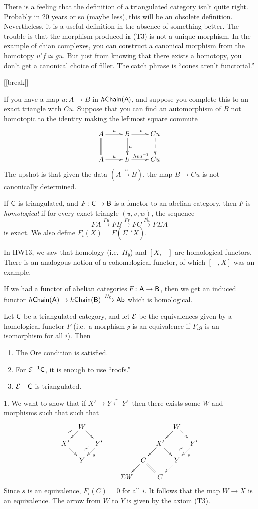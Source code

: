 There is a feeling that the definition of a triangulated category isn't quite right. Probably in 20 years or so (maybe less), this will be an obsolete definition. Nevertheless, it is a useful definition in the absence of something better. The trouble is that the morphism produced in (T3) is not a unique morphism. In the example of chian complexes, you can construct a canonical morphism from the homotopy $u'f\simeq gu$. But just from knowing that there exists a homotopy, you don't get a canonical choice of filler. The catch phrase is ``cones aren't functorial.''

[[break]]

If you have a map $u\colon A\to B$ in $h\text{\sf Chain}(\text{\sf A})$, and suppose you complete this to an exact triangle with $Cu$. Suppose that you can find an automorphism of $B$ not homotopic to the identity making the leftmost square commute
\[\xymatrix{
 A\ar[r]^u \ar@{=}[d] & B \ar[d]^a\ar[r]^v & Cu \ar@{-->}[d]\\
 A\ar[r]^u & B \ar[r]^{hva^{-1}} & Cu
}\]
The upshot is that given the data $(A\xrightarrow u B)$, the map $B\to Cu$ is not canonically determined.
\begin{definition}
 If $\text{\sf C}$ is triangulated, and $F\colon \text{\sf C}\to \text{\sf B}$ is a functor to an abelian category, then $F$ is \emph{homological} if for every exact triangle $(u,v,w)$, the sequence
 \[
  FA\xrightarrow{Fu} FB\xrightarrow{Fv} FC\xrightarrow{Fw} F\Sigma A
 \]
 is exact. We also define $F_i(X)=F(\Sigma^{-i}X)$.
\end{definition}
In HW13, we saw that homology (i.e.~$H_0$) and $[X,-]$ are homological functors. There is an analogous notion of a cohomological functor, of which $[-,X]$ was an example.

If we had a functor of abelian categories $F\colon \text{\sf A}\to \text{\sf B}$, then we get an induced functor $h\text{\sf Chain}(\text{\sf A})\to h\text{\sf Chain}(\text{\sf B})\xrightarrow{H_0} \text{\sf Ab}$ which is homological.

Let $\text{\sf C}$ be a triangulated category, and let $\mathcal{E}$ be the equivalences given by a homological functor $F$ (i.e.~a morphism $g$ is an equivalence if $F_ig$ is an isomorphism for all $i$). Then
\begin{enumerate}
 \item The Ore condition is satisfied.
 \item For $\mathcal{E}^{-1}\text{\sf C}$, it is enough to use ``roofs.''
 \item $\mathcal{E}^{-1}\text{\sf C}$ is triangulated.
\end{enumerate}
1. We want to show that if $X'\to Y\xleftarrow\sim Y'$, then there exists some $W$ and morphisms such that such that
\[\xymatrix@!0{
 & W\ar[dl]_@{~} \ar[dr]\\
 X'\ar[dr] & & Y'\ar[dl]_@{~}^s\\
 & Y
}\qquad
\xymatrix@!0{
 & & & W\ar[dl] \ar@{-->}[dr] \\
 & & X'\ar[dr] \ar[dl] & & Y'\ar[dl]_@{~}^s\\
 &  C\ar@{=}[dr] \ar[dl]& & Y \ar[dl]\\
 \Sigma W & & C
}\]
Since $s$ is an equivalence, $F_i(C)=0$ for all $i$. It follows that the map $W\to X$ is an equivalence. The arrow from $W$ to $Y$ is given by the axiom (T3).

